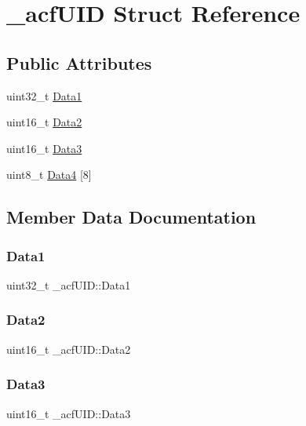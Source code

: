 \hypertarget{a01405}{}\section{\+\_\+acf\+U\+ID Struct Reference}
\label{a01405}
\subsection*{Public Attributes}
\begin{DoxyCompactItemize}
\item 
uint32\+\_\+t \mbox{\hyperlink{a01405_a0fdbc775b496913371bea67f64096709}{Data1}}
\item 
uint16\+\_\+t \mbox{\hyperlink{a01405_a9e816d2f417cde4bd5173e350b68f27c}{Data2}}
\item 
uint16\+\_\+t \mbox{\hyperlink{a01405_af70c96a9f1b553abf206e7d5037c0e0e}{Data3}}
\item 
uint8\+\_\+t \mbox{\hyperlink{a01405_aefd8884cd99d91f3213573876983b0ed}{Data4}} \mbox{[}8\mbox{]}
\end{DoxyCompactItemize}


\subsection{Member Data Documentation}
\mbox{\label{a01405_a0fdbc775b496913371bea67f64096709}} 
\subsubsection{\texorpdfstring{Data1}{Data1}}
{\footnotesize\ttfamily uint32\+\_\+t \+\_\+acf\+U\+I\+D\+::\+Data1}

\mbox{\label{a01405_a9e816d2f417cde4bd5173e350b68f27c}} 
\subsubsection{\texorpdfstring{Data2}{Data2}}
{\footnotesize\ttfamily uint16\+\_\+t \+\_\+acf\+U\+I\+D\+::\+Data2}

\mbox{\label{a01405_af70c96a9f1b553abf206e7d5037c0e0e}} 
\subsubsection{\texorpdfstring{Data3}{Data3}}
{\footnotesize\ttfamily uint16\+\_\+t \+\_\+acf\+U\+I\+D\+::\+Data3}

